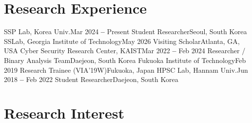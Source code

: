 \documentclass[letterpaper,11pt]{article}
\begin{document}




\section{Research Experience}
  \vspace{3pt}
  \resumeSubHeadingListStart
      \resumeSubheading
      {SSP Lab, Korea Univ.}{Mar 2024 \textbf{--} Present}
      {Student Researcher}{Seoul, South Korea}
      \vspace{3pt}
      \resumeSubheading
      {SSLab, Georgia Institute of Technology}{May 2026}
      {Visiting Scholar}{Atlanta, GA, USA}
      \vspace{3pt}
      \resumeSubheading
      {Cyber Security Research Center, KAIST}{Mar 2022 \textbf{--} Feb 2024}
      {Researcher / Binary Analysis Team}{Daejeon, South Korea}
      \vspace{3pt}
      \resumeSubheading
      {Fukuoka Institute of Technology}{Feb 2019}
      {Research Trainee (VIA'19W)}{Fukuoka, Japan}
      \vspace{3pt}
      \resumeSubheading
      {HPSC Lab, Hannam Univ.}{Jun 2018 \textbf{--} Feb 2022}
      {Student Researcher}{Daejeon, South Korea}
  \resumeSubHeadingListEnd


\section{Research Interest}
  \vspace{3pt}
  \resumeSubHeadingListStart
\end{document}
